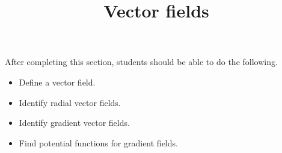 \documentclass{ximera}
\title{Vector fields}
\begin{document}
\begin{abstract}
\end{abstract}
\maketitle

\begin{sectionOutcomes}

After completing this section, students should be able to do the following.

\begin{itemize}
\item Define a vector field.
\item Identify radial vector fields.
\item Identify gradient vector fields.
\item Find potential functions for gradient fields.
\end{itemize}

\end{sectionOutcomes}
\end{document}
